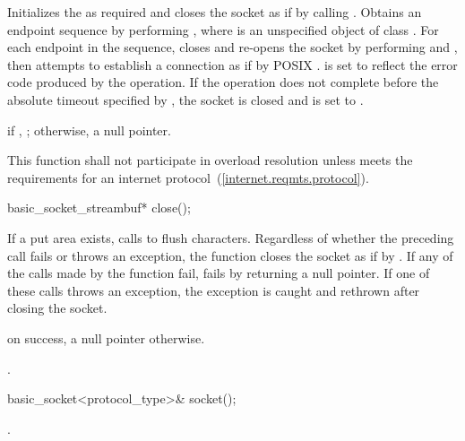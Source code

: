 \begin{itemdescr}
\pnum
\effects Initializes the  as required and closes the socket as if by calling . Obtains an endpoint sequence  by performing , where  is an unspecified object of class . For each endpoint  in the sequence, closes and re-opens the socket by performing  and , then attempts to establish a connection as if by POSIX .  is set to reflect the error code produced by the operation. If the operation does not complete before the absolute timeout specified by , the socket is closed and  is set to .

\pnum
\returns if , ; otherwise, a null pointer.

\pnum
\remarks This function shall not participate in overload resolution unless  meets the requirements for an internet protocol~(\ref{internet.reqmts.protocol}).
\end{itemdescr}

\begin{itemdecl}
basic_socket_streambuf* close();
\end{itemdecl}

\begin{itemdescr}
\pnum
\effects If a put area exists, calls  to flush characters. Regardless of whether the preceding call fails or throws an exception, the function closes the socket as if by . If any of the calls made by the function fail,  fails by returning a null pointer. If one of these calls throws an exception, the exception is caught and rethrown after closing the socket.

\pnum
\returns {} on success, a null pointer otherwise.

\pnum
\postconditions {}.
\end{itemdescr}

\begin{itemdecl}
basic_socket<protocol_type>& socket();
\end{itemdecl}

\begin{itemdescr}
\pnum
\returns {}.
\end{itemdescr}

